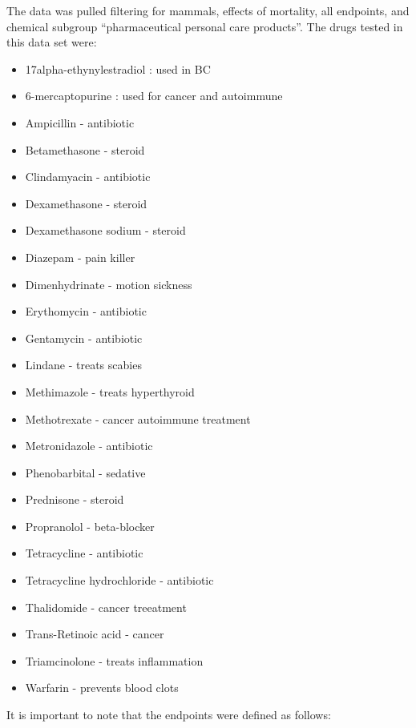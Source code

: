 \documentclass[12pt,]{article}
\providecommand{\tightlist}{%
  \setlength{\itemsep}{0pt}\setlength{\parskip}{0pt}}
\begin{document}
The data was pulled filtering for mammals, effects of mortality, all
endpoints, and chemical subgroup ``pharmaceutical personal care
products''. The drugs tested in this data set were:

\begin{itemize}
\tightlist
\item
  17alpha-ethynylestradiol : used in BC
\item
  6-mercaptopurine : used for cancer and autoimmune
\item
  Ampicillin - antibiotic
\item
  Betamethasone - steroid
\item
  Clindamyacin - antibiotic
\item
  Dexamethasone - steroid
\item
  Dexamethasone sodium - steroid
\item
  Diazepam - pain killer
\item
  Dimenhydrinate - motion sickness
\item
  Erythomycin - antibiotic
\item
  Gentamycin - antibiotic
\item
  Lindane - treats scabies
\item
  Methimazole - treats hyperthyroid
\item
  Methotrexate - cancer autoimmune treatment
\item
  Metronidazole - antibiotic
\item
  Phenobarbital - sedative
\item
  Prednisone - steroid
\item
  Propranolol - beta-blocker
\item
  Tetracycline - antibiotic
\item
  Tetracycline hydrochloride - antibiotic
\item
  Thalidomide - cancer treeatment
\item
  Trans-Retinoic acid - cancer
\item
  Triamcinolone - treats inflammation
\item
  Warfarin - prevents blood clots
\end{itemize}

It is important to note that the endpoints were defined as follows:
\end{document}
